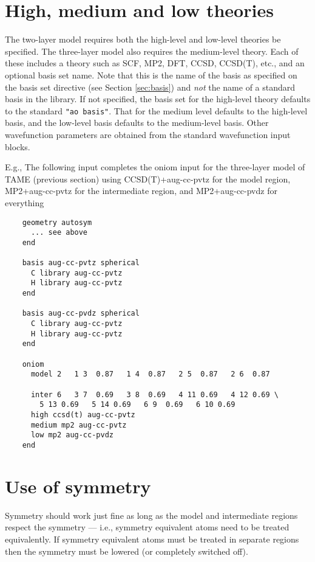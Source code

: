 \section{High, medium and low theories}

The two-layer model requires both the high-level and low-level
theories be specified.  The three-layer model also requires the
medium-level theory.  Each of these includes a theory such as SCF,
MP2, DFT, CCSD, CCSD(T), etc., and an optional basis set name.  Note
that this is the name of the basis as specified on the basis set
directive (see Section \ref{sec:basis}) and {\em not} the name of a
standard basis in the library.  If not specified, the basis set for
the high-level theory defaults to the standard \verb+"ao basis"+.
That for the medium level defaults to the high-level basis, and the
low-level basis defaults to the medium-level basis.  Other
wavefunction parameters are obtained from the standard wavefunction
input blocks.

E.g., The following input completes the oniom input for the
three-layer model of TAME (previous section) using CCSD(T)+aug-cc-pvtz
for the model region, MP2+aug-cc-pvtz for the intermediate region, and
MP2+aug-cc-pvdz for everything
\begin{verbatim}
    geometry autosym
      ... see above
    end

    basis aug-cc-pvtz spherical
      C library aug-cc-pvtz
      H library aug-cc-pvtz
    end

    basis aug-cc-pvdz spherical
      C library aug-cc-pvtz
      H library aug-cc-pvtz
    end

    oniom      
      model 2   1 3  0.87   1 4  0.87   2 5  0.87   2 6  0.87

      inter 6   3 7  0.69   3 8  0.69   4 11 0.69   4 12 0.69 \
		5 13 0.69   5 14 0.69   6 9  0.69   6 10 0.69
      high ccsd(t) aug-cc-pvtz
      medium mp2 aug-cc-pvtz
      low mp2 aug-cc-pvdz
    end
\end{verbatim}

\section{Use of symmetry}

Symmetry should work just fine as long as the model and intermediate
regions respect the symmetry --- i.e., symmetry equivalent atoms need
to be treated equivalently.  If symmetry equivalent atoms must be
treated in separate regions then the symmetry must be lowered (or
completely switched off).  

